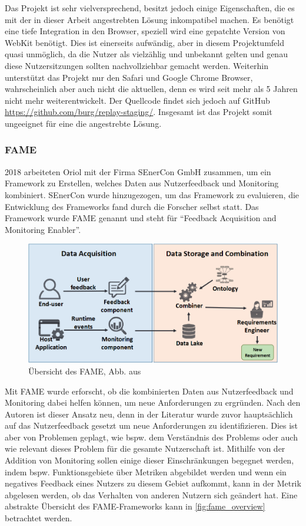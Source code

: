 Das Projekt ist sehr vielversprechend, besitzt jedoch einige Eigenschaften, die es mit der in dieser Arbeit angestrebten Lösung inkompatibel machen. Es benötigt eine tiefe Integration in den Browser, speziell wird eine gepatchte Version von WebKit benötigt. Dies ist einerseits aufwändig, aber in diesem Projektumfeld quasi unmöglich, da die Nutzer als vielzählig und unbekannt gelten und genau diese Nutzersitzungen sollten nachvollziehbar gemacht werden. Weiterhin unterstützt das Projekt nur den Safari und Google Chrome Browser, wahrscheinlich aber auch nicht die aktuellen, denn es wird seit mehr als 5 Jahren nicht mehr weiterentwickelt. Der Quellcode findet sich jedoch auf GitHub \url{https://github.com/burg/replay-staging/}. Insgesamt ist das Projekt somit ungeeignet für eine die angestrebte Lösung.

\subsubsection{FAME}

2018 arbeiteten Oriol \etal \cite{FamePaper} mit der Firma SEnerCon GmbH zusammen, um ein Framework zu Erstellen, welches Daten aus Nutzerfeedback und Monitoring kombiniert. SEnerCon wurde hinzugezogen, um das Framework zu evaluieren, die Entwicklung des Frameworks fand durch die Forscher selbst statt. Das Framework wurde FAME genannt und steht für \enquote{Feedback Acquisition and Monitoring Enabler}.

\begin{figure}
\centering
\includegraphics[width=\linewidth]{img/03_methoden/fame_overview.png}
\caption{Übersicht des FAME, Abb. aus \cite{FamePaper}}
\label{fig:fame_overview}
\end{figure}

Mit FAME wurde erforscht, ob die kombinierten Daten aus Nutzerfeedback und Monitoring dabei helfen können, um neue Anforderungen zu ergründen. Nach den Autoren ist dieser Ansatz neu, denn in der Literatur wurde zuvor hauptsächlich auf das Nutzerfeedback gesetzt um neue Anforderungen zu identifizieren. Dies ist aber von Problemen geplagt, wie bspw. dem Verständnis des Problems oder auch wie relevant dieses Problem für die gesamte Nutzerschaft ist. Mithilfe von der Addition von Monitoring sollen einige dieser Einschränkungen begegnet werden, indem bspw. Funktionsgebiete über Metriken abgebildet werden und wenn ein negatives Feedback eines Nutzers zu diesem Gebiet aufkommt, kann in der Metrik abgelesen werden, ob das Verhalten von anderen Nutzern sich geändert hat. Eine abstrakte Übersicht des FAME-Frameworks kann in \autoref{fig:fame_overview} betrachtet werden.

